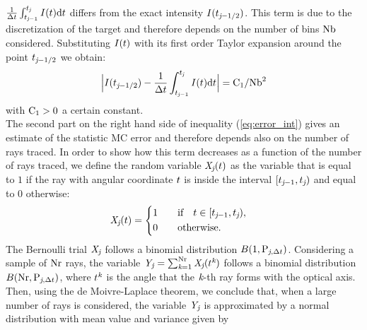  $\frac{1}{\Delta t}\int_{t_{\textit{j}-1}}^{t_{\textit{j}}} I(t)\textrm{d}t$ differs from the exact intensity $I(t_{\textit{j}-1/2})$.
This term is due to the discretization of the target and therefore depends on the number of bins $\textrm{Nb}$ considered.
  Substituting $I(t)$ with its first order Taylor expansion around the point $t_{\textit{j}-1/2}$ we obtain:
\begin{equation}\Big|I(t_{\textit{j}-1/2})-\frac{1}{\Delta t}\int_{t_{\textit{j}-1}}^{t_{\textit{j}}} I(t)\textrm{d}t\Big| = \textrm{C}_1/\textrm{Nb}^2\end{equation}
with $\textrm{C}_1>0$ a certain constant. \\
\indent
The second part on the right hand side of inequality (\ref{eq:error_int}) gives an estimate of the statistic MC error and therefore depends also on the
number of rays traced.
In order to show how this term decreases as a function of the number of rays traced,
we define the random variable $\textit{X}_{\textit{j}}(t)$ as the variable that is equal to $1$ if the ray with angular coordinate $t$
is inside the interval $[t_{\textit{j}-1}, t_{\textit{j}})$ and equal to $0$ otherwise:
\begin{equation}
\label{radom_variable}
\textit{X}_{\textit{j}}(t) = \begin{cases} \begin{aligned}
1& \qquad \mbox{if} \quad t\in [t_{\textit{j}-1}, t_{\textit{j}}),\\
0 & \qquad \mbox{otherwise}.
\end{aligned}\end{cases}
\end{equation}
The Bernoulli trial $ \textit{X}_{\textit{j}}$ follows a binomial distribution $B(1,\textrm{P}_{\textit{j}, \Delta t})$.
Considering a sample of $\textrm{Nr}$ rays, the variable $\textit{Y}_{\textit{j}} = \sum_{\textit{k}=1}^{\textrm{Nr}} \textit{X}_{\textit{j}}(t^{\textit{k}})$
follows a binomial distribution $B(\textrm{Nr}, \textrm{P}_{\textit{j},\Delta t})$, where $t^{\textit{k}}$ is the angle that the $\textit{k}$-th ray forms
 with the optical axis. Then, using the de Moivre-Laplace theorem, we conclude that, when a large number of rays is considered, the variable $\textit{Y}_{\textit{j}}$ is approximated by a normal distribution with mean value and variance given by 
